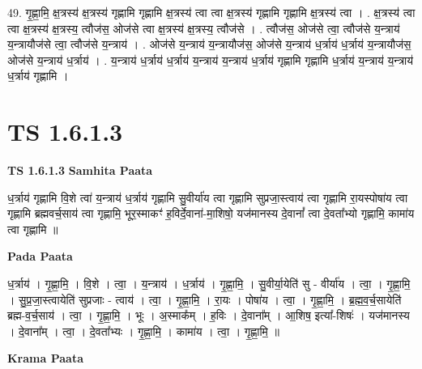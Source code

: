 \documentclass[17pt]{extarticle}
\begin{document}
49. गृ॒ह्णा॒मि॒ क्ष॒त्रस्य॑ क्ष॒त्रस्य॑ गृह्णामि गृह्णामि क्ष॒त्रस्य॑ त्वा त्वा क्ष॒त्रस्य॑ गृह्णामि गृह्णामि क्ष॒त्रस्य॑ त्वा । . क्ष॒त्रस्य॑ त्वा त्वा क्ष॒त्रस्य॑ क्ष॒त्रस्य॒ त्वौज॑स॒ ओज॑से त्वा क्ष॒त्रस्य॑ क्ष॒त्रस्य॒ त्वौज॑से । . त्वौज॑स॒ ओज॑से त्वा॒ त्वौज॑से य॒न्त्राय॑ य॒न्त्रायौज॑से त्वा॒ त्वौज॑से य॒न्त्राय॑ । . ओज॑से य॒न्त्राय॑ य॒न्त्रायौज॑स॒ ओज॑से य॒न्त्राय॑ ध॒र्त्राय॑ ध॒र्त्राय॑ य॒न्त्रायौज॑स॒ ओज॑से य॒न्त्राय॑ ध॒र्त्राय॑ । . य॒न्त्राय॑ ध॒र्त्राय॑ ध॒र्त्राय॑ य॒न्त्राय॑ य॒न्त्राय॑ ध॒र्त्राय॑ गृह्णामि गृह्णामि ध॒र्त्राय॑ य॒न्त्राय॑ य॒न्त्राय॑ ध॒र्त्राय॑ गृह्णामि । \newline
\pagebreak
{}

\section{ TS 1.6.1.3 }

\textbf{TS 1.6.1.3 } \newline
\textbf{Samhita Paata} \newline

ध॒र्त्राय॑ गृह्णामि वि॒शे त्वा॑ य॒न्त्राय॑ ध॒र्त्राय॑ गृह्णामि सु॒वीर्या॑य त्वा गृह्णामि सुप्रजा॒स्त्वाय॑ त्वा गृह्णामि रा॒यस्पोषा॑य त्वा गृह्णामि ब्रह्मवर्च॒साय॑ त्वा गृह्णामि॒ भूर॒स्माकꣳ॑ ह॒विर्दे॒वाना॑-मा॒शिषो॒ यज॑मानस्य दे॒वानां᳚ त्वा दे॒वता᳚भ्यो गृह्णामि॒ कामा॑य त्वा गृह्णामि ॥ \newline

\textbf{Pada Paata} \newline

ध॒र्त्राय॑ । गृ॒ह्णा॒मि॒ । वि॒शे । त्वा॒ । य॒न्त्राय॑ । ध॒र्त्राय॑ । गृ॒ह्णा॒मि॒ । सु॒वीर्या॒येति॑ सु - वीर्या॑य । त्वा॒ । गृ॒ह्णा॒मि॒ । सु॒प्र॒जा॒स्त्वायेति॑ सुप्रजाः - त्वाय॑ । त्वा॒ । गृ॒ह्णा॒मि॒ । रा॒यः । पोषा॑य । त्वा॒ । गृ॒ह्णा॒मि॒ । ब्र॒ह्म॒व॒र्च॒सायेति॑ ब्रह्म-व॒र्च॒साय॑ । त्वा॒ । गृ॒ह्णा॒मि॒ । भूः । अ॒स्माक᳚म् । ह॒विः । दे॒वाना᳚म् । आ॒शिष॒ इत्या᳚-शिषः॑ । यज॑मानस्य । दे॒वाना᳚म् । त्वा॒ । दे॒वता᳚भ्यः । गृ॒ह्णा॒मि॒ । कामा॑य । त्वा॒ । गृ॒ह्णा॒मि॒ ॥  \newline


\textbf{Krama Paata} \newline
\end{document}

